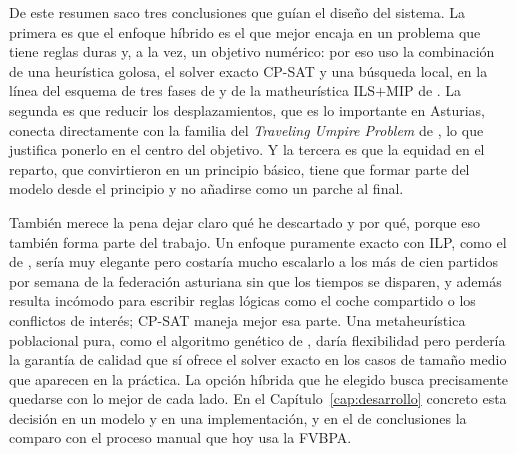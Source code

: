 \documentclass[11pt,a4paper,spanish]{book}
\numberwithin{equation}{chapter}
\numberwithin{figure}{chapter}
\numberwithin{table}{chapter}
\newcommand{\fuente}[1]{\par\vspace{2pt}{\footnotesize\textit{Fuente: #1}}}
\begin{document}
De este resumen saco tres conclusiones que guían el diseño del sistema. La primera es que el enfoque híbrido es el que mejor encaja en un problema que tiene reglas duras y, a la vez, un objetivo numérico: por eso uso la combinación de una heurística golosa, el solver exacto CP-SAT \cite{cpsat} y una búsqueda local, en la línea del esquema de tres fases de  y de la matheurística ILS$+$MIP de . La segunda es que reducir los desplazamientos, que es lo importante en Asturias, conecta directamente con la familia del \emph{Traveling Umpire Problem} de , lo que justifica ponerlo en el centro del objetivo. Y la tercera es que la equidad en el reparto, que  convirtieron en un principio básico, tiene que formar parte del modelo desde el principio y no añadirse como un parche al final.

También merece la pena dejar claro qué he descartado y por qué, porque eso también forma parte del trabajo. Un enfoque puramente exacto con ILP, como el de , sería muy elegante pero costaría mucho escalarlo a los más de cien partidos por semana de la federación asturiana sin que los tiempos se disparen, y además resulta incómodo para escribir reglas lógicas como el coche compartido o los conflictos de interés; CP-SAT maneja mejor esa parte. Una metaheurística poblacional pura, como el algoritmo genético de , daría flexibilidad pero perdería la garantía de calidad que sí ofrece el solver exacto en los casos de tamaño medio que aparecen en la práctica. La opción híbrida que he elegido busca precisamente quedarse con lo mejor de cada lado. En el Capítulo~\ref{cap:desarrollo} concreto esta decisión en un modelo y en una implementación, y en el de conclusiones la comparo con el proceso manual que hoy usa la FVBPA.

\end{document}
